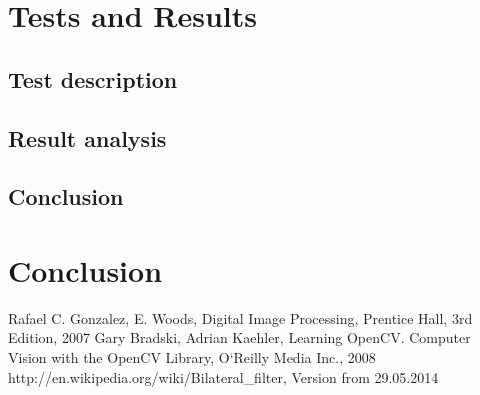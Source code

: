 \documentclass[a4paper,onecolumn,oneside,12pt]{memoir}
\begin{document}
\chapter{Tests and Results}

\section{Test description}

\section{Result analysis}

\section{Conclusion}


\chapter{Conclusion}

\newpage

\begin{thebibliography}{   }

          {Rafael C. Gonzalez, E. Woods, Digital Image Processing, Prentice Hall, 3rd Edition, 2007}
          {Gary Bradski, Adrian Kaehler, Learning OpenCV. Computer Vision with the OpenCV Library,
          O`Reilly Media Inc., 2008}
          {http://en.wikipedia.org/wiki/Bilateral\_filter, Version from 29.05.2014}


\end{thebibliography}
\end{document}
